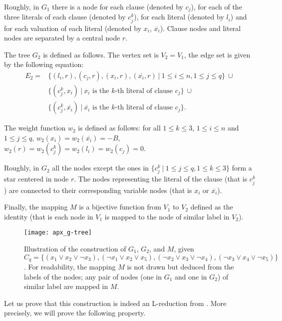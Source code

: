 		Roughly, in $G_1$ there is a node for each clause (denoted by $c_j$), for each of the three literals of each clause (denoted by $c_j^k$), for each literal (denoted by $l_i$) and for each valuation of each literal (denoted by $x_i$, $\overline{x_i}$). Clause nodes and literal nodes are separated by a central node $r$.

		The tree $G_2$ is defined as follows. The vertex set is $V_2=V_1$, the edge set is given by the following equation:
		\begin{align*}
		E_2= & \{(l_i,r), (c_j,r), (x_i,r), (\overline{x_i},r) ~\vert~ 1\leq i\leq n, 1\leq j \leq q\} ~\cup \\
		& \{(c^k_j,x_i) ~\vert~ x_i \text{ is the  } k\text{-th literal of clause } c_j\} ~\cup\\
		& \{(c^k_j,\overline{x_i}) ~\vert~ \overline{x_i} \text{ is the } k\text{-th literal of clause } c_j\}.
		\end{align*}

		The weight function $w_2$ is defined as follows: for all $1\leq k \leq 3$, $1\leq i\leq n$ and $1\leq j \leq q$, $w_2(x_i)=w_2(\overline{x_i})=-B$, $w_2(r)=w_2(c_j^k)=w_2(l_i)=w_2(c_j)=0$.


		Roughly, in $G_2$ all the nodes except the ones in $\{c_j^k~\vert~ 1\leq j \leq q, 1\leq k\leq 3\}$ form a star centered in node $r$. The nodes representing the literal of the clause (that is $c_j^k$) are connected to their corresponding variable nodes (that is $x_i$ or $\overline{x_i}$).

		Finally, the mapping $M$ is a bijective function from $V_1$ to $V_2$ defined as the identity (that is each node in $V_1$ is mapped to the node of similar label in $V_2$).


		\begin{figure}[ht]
    	 	 
    	 	 \centering
    	 	 \texttt{[image: apx\_g-tree]}
    	 	 \caption{Illustration of the construction of $G_1$, $G_2$, and $M$, given $C_q = \{(x_1 \vee x_2 \vee \neg{}x_3), (\neg{}x_1 \vee x_2 \vee x_5), (\neg{}x_2 \vee x_3 \vee \neg{}x_4), (\neg{}x_3 \vee x_4 \vee \neg{}x_5)\}$. For readability, the mapping $M$ is not drawn but deduced from the labels of the nodes; any pair of nodes (one in $G_1$ and one in $G_2$) of similar label are mapped in $M$.}\label{fig:g-tree}
    	 	 \end{figure}
   		
		Let us prove that this construction is indeed an L-reduction from \msat{}. More precisely, we will prove the following property.

